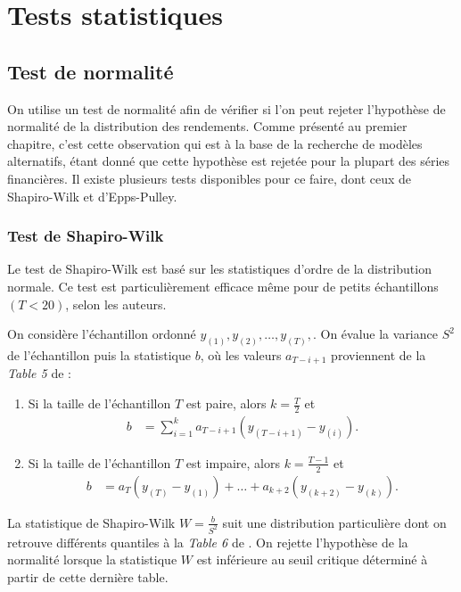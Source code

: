 \chapter{Tests statistiques}

\section{Test de normalité}
\label{sec:testnormalite}

On utilise un test de normalité afin de vérifier si l'on peut rejeter
l'hypothèse de normalité de la distribution des rendements. Comme
présenté au premier chapitre, c'est cette observation qui est à la
base de la recherche de modèles alternatifs, étant donné que cette
hypothèse est rejetée pour la plupart des séries financières. Il
existe plusieurs tests disponibles pour ce faire, dont ceux de
Shapiro-Wilk et d’Epps-Pulley.

\subsection{Test de Shapiro-Wilk}
\label{sec:test-de-shapiro}

Le test de Shapiro-Wilk \citep{shapiro1965analysis} est basé sur les
statistiques d'ordre de la distribution normale. Ce test est
particulièrement efficace même pour de petits échantillons $(T<20)$,
selon les auteurs.

On considère l'échantillon ordonné
$y_{(1)},y_{(2)},\ldots,y_{(T)},$. On évalue la variance $S^2$ de
l'échantillon puis la statistique $b$, où les valeurs $a_{T-i+1}$
proviennent de la \emph{Table 5} de \cite{shapiro1965analysis}:
\begin{enumerate}
\item Si la taille de l'échantillon $T$ est paire, alors
  $k=\frac{T}{2}$ et
  \begin{align}
    \label{eq:shapirowilkb1}
    b &= \sum_{i=1}^{k}a_{T-i+1}(y_{(T-i+1)}-y_{(i)}).
  \end{align}
\item Si la taille de l'échantillon $T$ est impaire, alors
  $k=\frac{T-1}{2}$ et
  \begin{align}
    \label{eq:shapirowilkb2}
    b &= a_{T}(y_{(T)}-y_{(1)}) + \ldots + a_{k+2}(y_{(k+2)}-y_{(k)}).
  \end{align}
\end{enumerate}

La statistique de Shapiro-Wilk $W = \frac{b}{S^2}$ suit une
distribution particulière dont on retrouve différents quantiles à la
\emph{Table 6} de \cite{shapiro1965analysis}. On rejette l'hypothèse
de la normalité lorsque la statistique $W$ est inférieure au seuil
critique déterminé à partir de cette dernière table.

